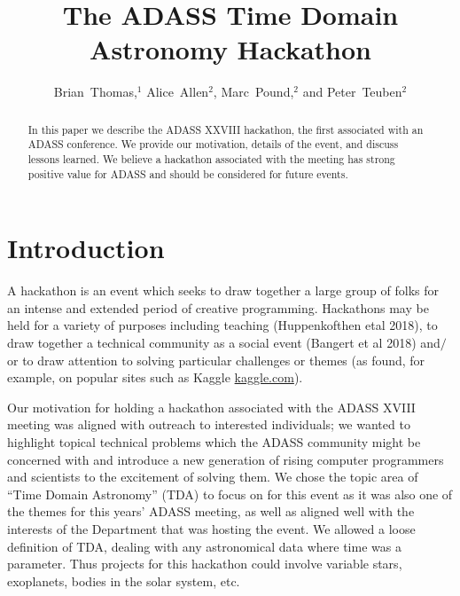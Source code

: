 \documentclass[11pt,twoside]{article}
\begin{document}
\title{The ADASS Time Domain Astronomy Hackathon}
\author{Brian~Thomas,$^1$ Alice~Allen$^2$, Marc~Pound,$^2$ and Peter~Teuben$^2$}







\begin{abstract}
In this paper we describe the ADASS XXVIII hackathon, the first associated with an ADASS conference. We provide our motivation, details of the event, and discuss lessons learned. We believe a hackathon associated with the meeting has strong positive value for ADASS and should be considered for future events.
\end{abstract}

\section{Introduction}

A hackathon is an event which seeks to draw together a large group of folks for an intense and extended period of creative programming. Hackathons may be held for a variety of purposes including teaching (Huppenkofthen etal 2018), to draw together a technical community as a social event (Bangert et al 2018) and$\slash$or to draw attention to  solving particular challenges or themes (as found, for example, on popular sites such as Kaggle \url{kaggle.com}).

Our motivation for holding a hackathon associated with the ADASS XVIII meeting was aligned with outreach to interested individuals; we wanted to highlight topical technical problems which the ADASS community might be concerned with and introduce a new generation of rising computer programmers and scientists to the excitement of solving them. We chose the topic area of ``Time Domain Astronomy''  (TDA) \citep{nebot2019} to focus on for this event as it was also one of the themes for this years’ ADASS meeting, as well as aligned well with the interests of the Department that was hosting the event. We allowed a loose definition of TDA, dealing with any astronomical data where time was a parameter. Thus projects for this hackathon could involve variable stars, exoplanets, bodies in the solar system, etc.
\end{document}
